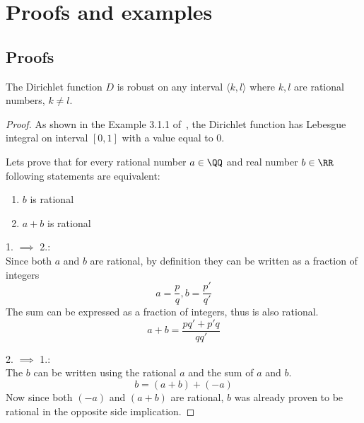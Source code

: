 \chapter{Proofs and examples}

\section{Proofs}

\begin{lemma}{The Dirichlet function $D$ is robust on any interval $\langle k, l\rangle$
    where $k, l$ are rational numbers, $k\neq l$.}\label{proof:dirichlet}
    \begin{proof}
        As shown in the Example 3.1.1 of~\cite{HONG200565},
        the Dirichlet function has Lebesgue integral
        on interval $[0, 1]$ with a value equal to $0$.

        Lets prove that for every rational number $a\in \QQ$
        and real number $b\in \RR$
        following statements are equivalent:
        \begin{enumerate}\setlength{\itemsep}{0pt}
            \item $b$ is rational
            \item $a+b$ is rational
        \end{enumerate}

        1. $\implies$ 2.:\\
        Since both $a$ and $b$ are rational,
        by definition they can be written as a fraction of integers
        \begin{equation*}
            a = \frac{p}{q}, b = \frac{p'}{q'}
        \end{equation*}
        The sum can be expressed as a fraction of integers,
        thus is also rational.
        \begin{equation*}
            a+b = \frac{pq'+p'q}{qq'}
        \end{equation*}

        2. $\implies$ 1.:\\
        The $b$ can be written using the rational $a$
        and the sum of $a$ and $b$.
        \begin{equation*}
            b = (a+b) + (-a)
        \end{equation*}
        Now since both $(-a)$ and $(a+b)$ are rational,
        $b$ was already proven to be rational in the opposite side implication.


\end{proof}
\end{lemma}
